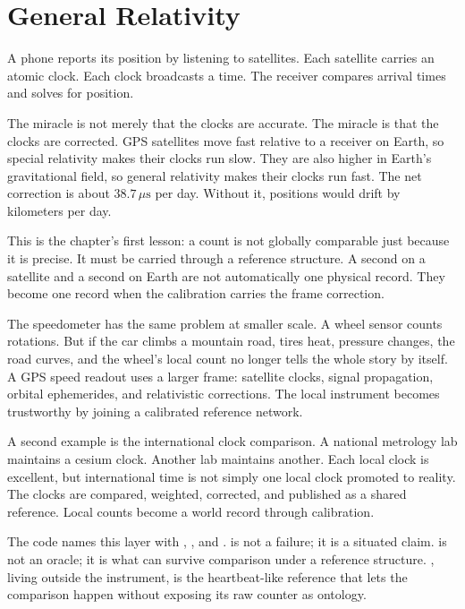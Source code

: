 \chapter{General Relativity}
\label{chap:general-relativity}


\begin{chapteressay}

A phone reports its position by listening to satellites. Each satellite carries
an atomic clock. Each clock broadcasts a time. The receiver compares arrival
times and solves for position.

The miracle is not merely that the clocks are accurate. The miracle is that the
clocks are corrected. GPS satellites move fast relative to a receiver on
Earth, so special relativity makes their clocks run slow. They are also higher
in Earth's gravitational field, so general relativity makes their clocks run
fast. The net correction is about $38.7\,\mu\mathrm{s}$ per day. Without it,
positions would drift by kilometers per day.

This is the chapter's first lesson: a count is not globally comparable just
because it is precise. It must be carried through a reference structure. A
second on a satellite and a second on Earth are not automatically one physical
record. They become one record when the calibration carries the frame
correction.

The speedometer has the same problem at smaller scale. A wheel sensor counts
rotations. But if the car climbs a mountain road, tires heat, pressure changes,
the road curves, and the wheel's local count no longer tells the whole story by
itself. A GPS speed readout uses a larger frame: satellite clocks, signal
propagation, orbital ephemerides, and relativistic corrections. The local
instrument becomes trustworthy by joining a calibrated reference network.

A second example is the international clock comparison. A national metrology
lab maintains a cesium clock. Another lab maintains another. Each local clock
is excellent, but international time is not simply one local clock promoted to
reality. The clocks are compared, weighted, corrected, and published as a
shared reference. Local counts become a world record through calibration.

The code names this layer with , , and
.  is not a failure; it is a situated claim.
 is not an oracle; it is what can survive comparison under a
reference structure. , living outside the instrument, is the
heartbeat-like reference that lets the comparison happen without exposing its
raw counter as ontology.


\end{chapteressay}

